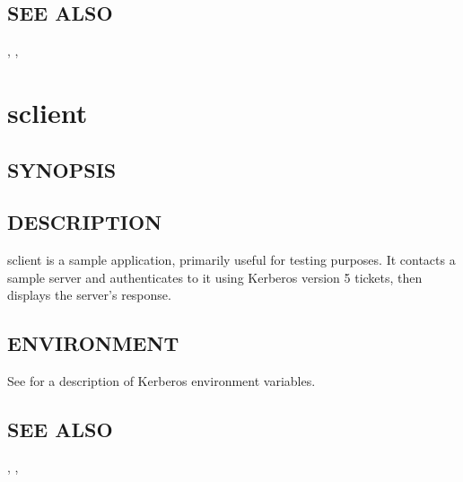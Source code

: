 \documentclass[letterpaper,10pt,english]{sphinxmanual}
\begin{document}
\subsection{SEE ALSO}
\label{\detokenize{user/user_commands/kvno:see-also}}
\sphinxAtStartPar
{\hyperref[\detokenize{user/user_commands/kinit:kinit-1}]{}}, {\hyperref[\detokenize{user/user_commands/kdestroy:kdestroy-1}]{}}, {\hyperref[\detokenize{user/user_config/kerberos:kerberos-7}]{}}

\sphinxstepscope


\section{sclient}
\label{\detokenize{user/user_commands/sclient:sclient}}\label{\detokenize{user/user_commands/sclient:sclient-1}}\label{\detokenize{user/user_commands/sclient::doc}}

\subsection{SYNOPSIS}
\label{\detokenize{user/user_commands/sclient:synopsis}}
\sphinxAtStartPar
{} 


\subsection{DESCRIPTION}
\label{\detokenize{user/user_commands/sclient:description}}
\sphinxAtStartPar
sclient is a sample application, primarily useful for testing
purposes.  It contacts a sample server  and
authenticates to it using Kerberos version 5 tickets, then displays
the server’s response.


\subsection{ENVIRONMENT}
\label{\detokenize{user/user_commands/sclient:environment}}
\sphinxAtStartPar
See {\hyperref[\detokenize{user/user_config/kerberos:kerberos-7}]{}} for a description of Kerberos environment
variables.


\subsection{SEE ALSO}
\label{\detokenize{user/user_commands/sclient:see-also}}
\sphinxAtStartPar
{\hyperref[\detokenize{user/user_commands/kinit:kinit-1}]{}}, , {\hyperref[\detokenize{user/user_config/kerberos:kerberos-7}]{}}



\renewcommand{\indexname}{Index}
\printindex
\end{document}

